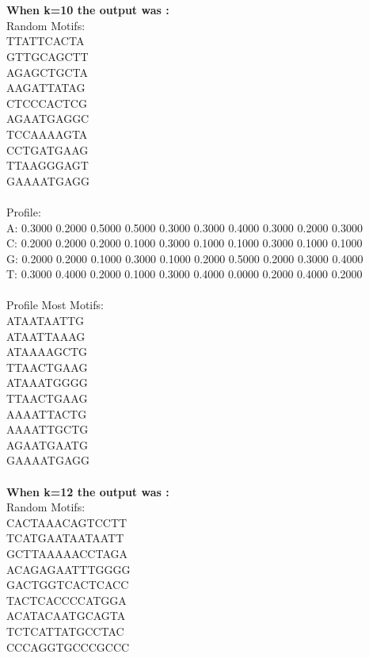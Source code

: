 \documentclass{report}
\begin{document}
\\\\
\textbf{When k=10 the output was :} \\
Random Motifs:\\
TTATTCACTA\\
GTTGCAGCTT\\
AGAGCTGCTA\\
AAGATTATAG\\
CTCCCACTCG\\
AGAATGAGGC\\
TCCAAAAGTA\\
CCTGATGAAG\\
TTAAGGGAGT\\
GAAAATGAGG\\
\\
Profile:\\
A: 0.3000 0.2000 0.5000 0.5000 0.3000 0.3000 0.4000 0.3000 0.2000 0.3000\\
C: 0.2000 0.2000 0.2000 0.1000 0.3000 0.1000 0.1000 0.3000 0.1000 0.1000\\
G: 0.2000 0.2000 0.1000 0.3000 0.1000 0.2000 0.5000 0.2000 0.3000 0.4000\\
T: 0.3000 0.4000 0.2000 0.1000 0.3000 0.4000 0.0000 0.2000 0.4000 0.2000\\
\\
Profile Most Motifs:\\
ATAATAATTG\\
ATAATTAAAG\\
ATAAAAGCTG\\
TTAACTGAAG\\
ATAAATGGGG\\
TTAACTGAAG\\
AAAATTACTG\\
AAAATTGCTG\\
AGAATGAATG\\
GAAAATGAGG\\
\\
\textbf{When k=12 the output was :}\\
Random Motifs:\\
CACTAAACAGTCCTT\\
TCATGAATAATAATT\\
GCTTAAAAACCTAGA\\
ACAGAGAATTTGGGG\\
GACTGGTCACTCACC\\
TACTCACCCCATGGA\\
ACATACAATGCAGTA\\
TCTCATTATGCCTAC\\
CCCAGGTGCCCGCCC\\
\end{document}
